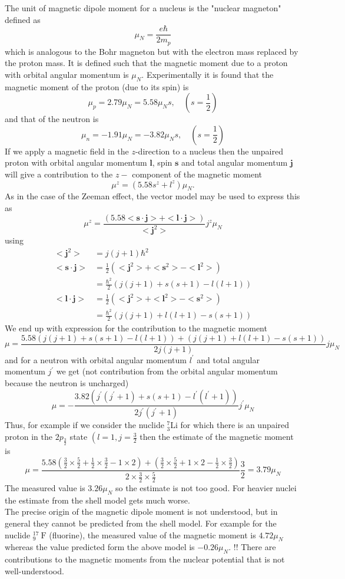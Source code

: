The unit of magnetic dipole moment for a nucleus is the "nuclear magneton" defined as\\
$$\mu_{N}=\frac{e \hbar}{2 m_{p}}$$
which is analogous to the Bohr magneton but with the electron mass replaced by the proton mass. It is defined such that the magnetic moment due to a proton with orbital angular momentum  is $\mu_{N} $.
Experimentally it is found that the magnetic moment of the proton (due to its spin) is
$$
\mu_{p}=2.79 \mu_{N}=5.58 \mu_{N} s, \quad\left(s=\frac{1}{2}\right)
$$
and that of the neutron is
$$
\mu_{n}=-1.91 \mu_{N}=-3.82 \mu_{N} s, \quad\left(s=\frac{1}{2}\right)
$$
If we apply a magnetic field in the $z$-direction to a nucleus then the unpaired proton with orbital angular momentum $\mathbf{l}$, spin $\mathbf{s}$ and total angular momentum $\mathbf{j}$ will give a contribution to the $z-$ component of the magnetic moment
$$
\mu^{z}=\left(5.58 s^{z}+l^{z}\right) \mu_{N} .
$$
As in the case of the Zeeman effect, the vector model may be used to express this as
$$
\mu^{z}=\frac{(5.58<\mathbf{s} \cdot \mathbf{j}>+<\mathbf{l} \cdot \mathbf{j}>)}{<\mathbf{j}^{2}>} j^{z} \mu_{N}
$$
using
$$
\begin{aligned}
<\mathbf{j}^{2}>&=j(j+1) \hbar^{2} \\
<\mathbf{s} \cdot \mathbf{j}>&=\frac{1}{2}\left(<\mathbf{j}^{2}>+<\mathbf{s}^{2}>-<\mathbf{l}^{2}>\right) \\
&=\frac{\hbar^{2}}{2}(j(j+1)+s(s+1)-l(l+1)) \\
<\mathbf{l} \cdot \mathbf{j}>&=\frac{1}{2}\left(<\mathbf{j}^{2}>+<\mathbf{l}^{2}>-<\mathbf{s}^{2}>\right) \\
&=\frac{\hbar^{2}}{2}(j(j+1)+l(l+1)-s(s+1))
\end{aligned}
$$
We end up with expression for the contribution to the magnetic moment
$$
\mu=\frac{5.58(j(j+1)+s(s+1)-l(l+1))+(j(j+1)+l(l+1)-s(s+1))}{2 j(j+1)} j \mu_{N}
$$
and for a neutron with orbital angular momentum $l^{\prime}$ and total angular momentum $j^{\prime}$ we get (not contribution from the orbital angular momentum because the neutron is uncharged)
$$
\mu=-\frac{3.82\left(j^{\prime}\left(j^{\prime}+1\right)+s(s+1)-l^{\prime}\left(l^{\prime}+1\right)\right)}{2 j^{\prime}\left(j^{\prime}+1\right)} j^{\prime} \mu_{N}
$$
Thus, for example if we consider the nuclide ${ }_{3}^{7} \mathrm{Li}$ for which there is an unpaired proton in the $2 p_{\frac{3}{2}}$ state $\left(l=1, j=\frac{3}{2}\right.$ then the estimate of the magnetic moment is
$$
\mu=\frac{5.58\left(\frac{3}{2} \times \frac{5}{2}+\frac{1}{2} \times \frac{3}{2}-1 \times 2\right)+\left(\frac{3}{2} \times \frac{5}{2}+1 \times 2-\frac{1}{2} \times \frac{3}{2}\right)}{2 \times \frac{3}{2} \times \frac{5}{2}} \frac{3}{2}=3.79 \mu_{N}
$$
The measured value is $3.26 \mu_{N}$ so the estimate is not too good. For heavier nuclei the estimate from the shell model gets much worse.\\
The precise origin of the magnetic dipole moment is not understood, but in general they cannot be predicted from the shell model. For example for the nuclide ${ }_{9}^{17} \mathrm{~F}$ (fluorine), the measured value of the magnetic moment is $4.72 \mu_{N}$ whereas the value predicted form the above model is $-0.26 \mu_{N}$. !! There are contributions to the magnetic moments from the nuclear potential that is not well-understood.
